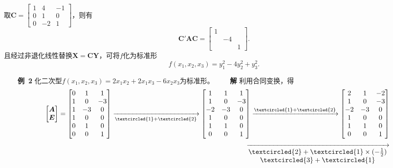 \documentclass[compress,mathserif,cjk]{beamer}
\theoremstyle{remark}
\numberwithin{equation}{section}
\newcommand{\hei}{\bf}      %
\begin{document}
\begin{CJK}{UTF8}{gbsn}
\begin{frame}
取$\bm C=\left[\begin{matrix}1&4&-1\\0&1&0\\0&-2&1\end{matrix}\right]$，则有
$$\bm C'\bm{AC}=\left[\begin{matrix}1&&\\&-4&\\&&1\end{matrix}\right].$$
且经过非退化线性替换$\bm X=\bm{CY}$，可将$f$化为标准形
$$f(x_1,x_2,x_3)=y_1^2-4y_2^2+y_3^2.$$
\end{frame}

\begin{frame}\small
\ \ \ \ {\hei 例~2} 化二次型$f(x_1,x_2,x_3)=2x_1x_2+2x_1x_3-6x_2x_3$为标准形。
\pause\vskip 5pt
\ \ \ \ {\hei 解} 利用合同变换，得
\begin{eqnarray*}
&&\left[\begin{matrix}\bm A\\\bm E\end{matrix}\right]=\left[\begin{matrix}0&1&1\\1&0&-3\\1&-3&0\\1&0&0\\0&1&0\\0&0&1\end{matrix}\right]
\xrightarrow[\textcircled{\scriptsize 1}+\textcircled{\scriptsize 2}]{}\left[\begin{matrix}1&1&1\\1&0&-3\\-2&-3&0\\1&0&0\\1&1&0\\0&0&1\end{matrix}\right]
\xrightarrow[]{\textcircled{\scriptsize 1}+\textcircled{\scriptsize 2}}\left[\begin{matrix}2&1&-2\\1&0&-3\\-2&-3&0\\1&0&0\\1&1&0\\0&0&1\end{matrix}\right]\\
&&\xrightarrow[\begin{matrix}\textcircled{\scriptsize 2}+\textcircled{\scriptsize 1}\times(-\frac{1}2)\\\textcircled{\scriptsize 3}+\textcircled{\scriptsize 1}\end{matrix}]{}

\end{eqnarray*}
\end{frame}
\end{CJK}
\end{document}
